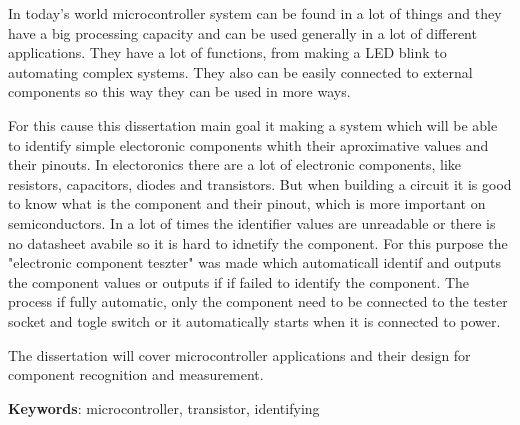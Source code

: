 In today's world microcontroller system can be found in a lot of things and
they have a big processing capacity and can be used generally in a lot of
different applications. They have a lot of functions, from making a LED
blink to automating complex systems. They also can be easily connected to
external components so this way they can be used in more ways.

For this cause this dissertation main goal it making a system which will be
able to identify simple electoronic components whith their aproximative
values and their pinouts.
In electoronics there are a lot of electronic components, like resistors,
capacitors, diodes and transistors. But when building a circuit
it is good to know what is the component and their pinout, which is more important
on semiconductors. In a lot of times the identifier values are unreadable
or there is no datasheet avabile so it is hard to idnetify the component.
For this purpose the "electronic component teszter" was made which automaticall
identif and outputs the component values or outputs if if failed to identify
the component. The process if fully automatic, only the component need to be 
connected to the tester socket and togle switch or it automatically starts
when it is connected to power.

The dissertation will cover microcontroller applications and their design
for component recognition and measurement.


\textbf{Keywords}: microcontroller, transistor, identifying